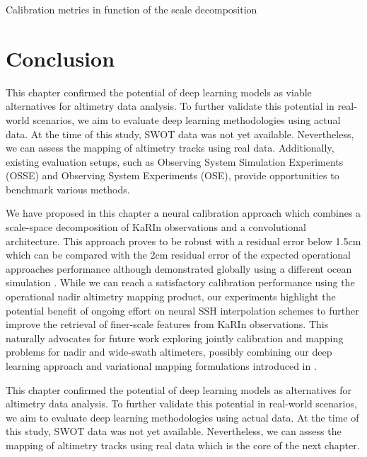 \begin{bibunit}
\begin{table}[!t]
\begin{center}
	
\end{center}
\caption{Calibration metrics in function of the scale decomposition}
\label{c3table:scale_dec}
\end{table}

\section{Conclusion}
\label{c3sec:conclusion}
\noindent

This chapter confirmed the potential of deep learning models as viable alternatives for altimetry data analysis. To further validate this potential in real-world scenarios, we aim to evaluate deep learning methodologies using actual data. At the time of this study, SWOT data was not yet available. Nevertheless, we can assess the mapping of altimetry tracks using real data. Additionally, existing evaluation setups, such as Observing System Simulation Experiments (OSSE) and Observing System Experiments (OSE), provide opportunities to benchmark various methods.

We have proposed in this chapter a neural calibration approach which combines a scale-space decomposition of KaRIn observations and a convolutional architecture. This approach proves to be robust with a 
residual error below 1.5cm which can be compared with the 2cm residual error of the expected operational approaches performance although demonstrated globally using a different ocean simulation \cite{Dibarboure_Ubelmann_Flamant_Briol_Peral_Bracher_Vergara_Faugere_Soulat_Picot_2022}. While we can reach a satisfactory calibration performance using the operational nadir altimetry mapping product, our experiments highlight the potential benefit of ongoing effort on neural SSH interpolation schemes to further improve the retrieval of finer-scale features from KaRIn observations.
This naturally advocates for future work exploring jointly calibration and mapping problems for nadir and wide-swath altimeters, possibly combining our deep learning approach and variational mapping formulations introduced in \cite{Febvre_Fablet_Sommer_Ubelmann_2022}.

This chapter confirmed the potential of deep learning models as alternatives for altimetry data analysis. To further validate this potential in real-world scenarios, we aim to evaluate deep learning methodologies using actual data. At the time of this study, SWOT data was not yet available. Nevertheless, we can assess the mapping of altimetry tracks using real data which is the core of the next chapter.


\end{bibunit}
